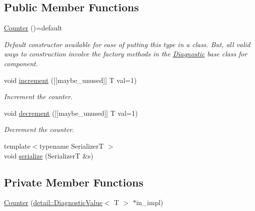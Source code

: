 \subsection*{Public Member Functions}
\begin{DoxyCompactItemize}
\item 
\hyperlink{structvt_1_1runtime_1_1component_1_1meter_1_1_counter_afbe8191f66fc515812ee5bf1b5d857a8}{Counter} ()=default
\begin{DoxyCompactList}\small\item\em Default constructor available for ease of putting this type in a class. But, all valid ways to construction involve the factory methods in the {\ttfamily \hyperlink{structvt_1_1runtime_1_1component_1_1_diagnostic}{Diagnostic}} base class for component. \end{DoxyCompactList}\item 
void \hyperlink{structvt_1_1runtime_1_1component_1_1meter_1_1_counter_a72800a7f697ea3bcc52b565d8e6bc35e}{increment} (\mbox{[}\mbox{[}maybe\+\_\+unused\mbox{]}\mbox{]} T val=1)
\begin{DoxyCompactList}\small\item\em Increment the counter. \end{DoxyCompactList}\item 
void \hyperlink{structvt_1_1runtime_1_1component_1_1meter_1_1_counter_a0b288a8858de5a1df69c08be59e81a74}{decrement} (\mbox{[}\mbox{[}maybe\+\_\+unused\mbox{]}\mbox{]} T val=1)
\begin{DoxyCompactList}\small\item\em Decrement the counter. \end{DoxyCompactList}\item 
{\footnotesize template$<$typename SerializerT $>$ }\\void \hyperlink{structvt_1_1runtime_1_1component_1_1meter_1_1_counter_a4eddbf849464269e14c11baaea206df2}{serialize} (SerializerT \&s)
\end{DoxyCompactItemize}
\subsection*{Private Member Functions}
\begin{DoxyCompactItemize}
\item 
\hyperlink{structvt_1_1runtime_1_1component_1_1meter_1_1_counter_a649a29b69ce8db44fa9643820cd75080}{Counter} (\hyperlink{structvt_1_1runtime_1_1component_1_1detail_1_1_diagnostic_value}{detail\+::\+Diagnostic\+Value}$<$ T $>$ $\ast$in\+\_\+impl)
\end{DoxyCompactItemize}
